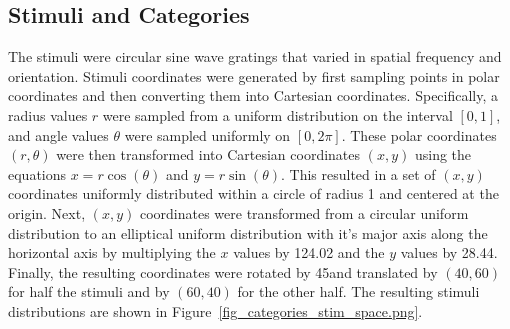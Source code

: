 \documentclass[doc, floatsintext]{apa7}
\begin{document}
\subsection{Stimuli and Categories}
The stimuli were circular sine wave gratings that varied in
spatial frequency and orientation.  Stimuli coordinates were
generated by first sampling points in polar coordinates and
then converting them into Cartesian coordinates.
Specifically, a radius values $r$ were sampled from a
uniform distribution on the interval $[0, 1]$, and angle
values $\theta$ were sampled uniformly on $[0, 2\pi]$.
These polar coordinates $(r, \theta)$ were then transformed
into Cartesian coordinates $(x, y)$ using the equations $x =
r \cos(\theta)$ and $y = r\sin(\theta)$. This resulted in a
set of $(x, y)$ coordinates uniformly distributed within a
circle of radius 1 and centered at the origin. Next, $(x,
y)$ coordinates were transformed from a circular uniform
distribution to an elliptical uniform distribution with it's
major axis along the horizontal axis by multiplying the $x$
values by 124.02 and the $y$ values by 28.44. Finally, the
resulting coordinates were rotated by 45\degree and
translated by $(40, 60)$ for half the stimuli and by $(60,
40)$ for the other half. The resulting stimuli distributions
are shown in Figure~\ref{fig_categories_stim_space.png}.
\end{document}
